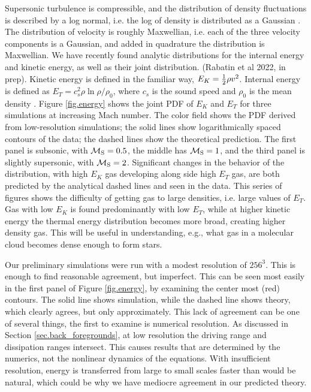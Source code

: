 Supersonic turbulence is compressible, and the distribution of density
fluctuations is described by a log normal, i.e. the log of density is
distributed as a Gaussian \citep{Vazquez-Semadeni94}.  The distribution of velocity is roughly Maxwellian,
i.e. each of the three velocity components is a Gaussian, and added in quadrature the
distribution is Maxwellian.  
We have recently found analytic distributions for the internal energy and
kinetic energy, as well as their joint
distribution.   (Rabatin et al 2022, in prep). Kinetic energy is defined in the familiar way, $E_K=\frac{1}{2} \rho
v^2$.  Internal energy is defined as $E_T= c_s^2 \rho \ln \rho/\rho_0$, where
$c_s$ is the sound speed and $\rho_0$ is the mean density \citep{Banerjee18}.  
Figure \ref{fig.energy} shows 
 the joint PDF of $E_K$ and $E_T$ for three simulations at increasing Mach
 number.  The color field shows the
PDF derived from low-resolution simulations; the solid lines show logarithmically spaced contours of
the data; the dashed lines show the theoretical prediction.  The first panel is
subsonic, with $\mathcal{M_{\rm{S}}}=0.5$, the middle has $\mathcal{M_{\rm{S}}}=1$, and the third panel is
slightly supersonic, with $\mathcal{M_{\rm{S}}}=2$.  Significant changes in the behavior of the
distribution, with high $E_K$ gas developing along side high $E_T$ gas, are both
predicted by the analytical dashed lines and seen in the data.  This series of
figures shows the difficulty of getting gas to large densities, i.e. large
values of $E_T$.  Gas with low $E_K$ is found predominantly with low $E_T$,
while at higher kinetic energy the thermal energy distribution becomes more
broad, creating higher density gas.  This will be useful in understanding, e.g.,
what gas in a molecular cloud becomes dense enough to form stars.

Our preliminary simulations were run with a modest resolution of $256^3$.  This
is enough to find reasonable agreement, but imperfect. This can be seen most
easily in the first panel of Figure \ref{fig.energy}, by examining the center
most (red) contours. The solid line shows simulation, while the dashed line
shows theory, which clearly agrees, but only approximately.  This lack of
agreement can be one of several things, the first to examine is numerical
resolution.  As discussed in Section \ref{sec.back_foregrounds}, at low
resolution the driving range and dissipation ranges intersect.  This causes
results that are determined by the numerics, not the nonlinear dynamics of the
equations.  
With insufficient resolution, energy is transferred from large to
small scales faster than would be natural, which could be why we have mediocre
agreement in our predicted theory.  


